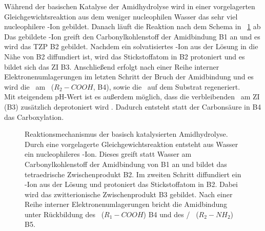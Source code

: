 Während der basischen Katalyse der Amidhydrolyse wird in einer vorgelagerten Gleichgewichtsreaktion aus dem weniger nucleophilen Wasser das sehr viel nucleophilere -Ion gebildet. Danach läuft die Reaktion nach dem Schema in \abb~\ref{fig:amid_basisch} ab \cites[288]{Latscha.2016}{Zahn.2004b}{Zahn.2004}\\

Das gebildete -Ion greift den Carbonylkohlenstoff der Amidbindung B1 an und es wird das \ac{TZP} B2 gebildet. Nachdem ein solvatisiertes -Ion aus der Lösung in die Nähe von B2 diffundiert ist, wird das Stickstoffatom in B2 protoniert und es bildet sich das \ac{ZI} B3. Anschließend erfolgt nach einer Reihe interner Elektronenumlagerungen im letzten Schritt der Bruch der Amidbindung und es wird die \carboxy~am \spacer~($R_2-COOH$, B4), sowie die \amino~auf dem Substrat regeneriert.\\

Mit steigendem pH-Wert ist es außerdem möglich, dass die verbleibenden \carboxy~am \ac{ZI} (B3) zusätzlich deprotoniert wird \cites{Zahn.2004}. Dadurch entsteht statt der Carbonsäure in B4 das Carboxylation.

\begin{figure}[H]
	\begin{flushleft}
	\end{flushleft}
	\caption[Reaktionsmechanismus der basisch katalysierten Amidhydrolyse]{Reaktionsmechanismus der basisch katalysierten Amidhydrolyse. Durch eine vorgelagerte Gleichgewichtsreaktion entsteht aus Wasser ein nucleophileres -Ion. Dieses greift statt Wasser am Carbonylkohlenstoff der Amidbindung von B1 an und bildet das tetraedrische Zwischenprodukt B2. Im zweiten Schritt diffundiert ein -Ion aus der Lösung und protoniert das Stickstoffatom in B2. Dabei wird das zwitterionische Zwischenprodukt B3 gebildet. Nach einer Reihe interner Elektronenumlagerungen bricht die Amidbindung unter Rückbildung des \spacers~($R_1-COOH$) B4 und des \substrats/ \spitze~($R_2-NH_2$) B5.}
	
	\label{fig:amid_basisch}
\end{figure}

